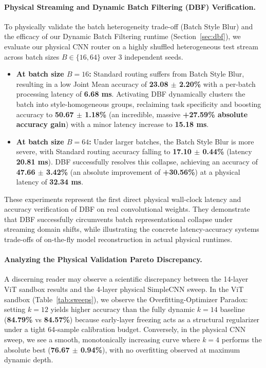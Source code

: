 \paragraph{Physical Streaming and Dynamic Batch Filtering (DBF) Verification.}
To physically validate the batch heterogeneity trade-off (Batch Style Blur) and the efficacy of our Dynamic Batch Filtering runtime (Section~\ref{sec:dbf}), we evaluate our physical CNN router on a highly shuffled heterogeneous test stream across batch sizes $B \in \{16, 64\}$ over 3 independent seeds. 
\begin{itemize}
    \item \textbf{At batch size $B=16$:} Standard routing suffers from Batch Style Blur, resulting in a low Joint Mean accuracy of \textbf{23.08 $\pm$ 2.20\%} with a per-batch processing latency of \textbf{6.68 ms}. Activating DBF dynamically clusters the batch into style-homogeneous groups, reclaiming task specificity and boosting accuracy to \textbf{50.67 $\pm$ 1.18\%} (an incredible, massive \textbf{+27.59\% absolute accuracy gain}) with a minor latency increase to \textbf{15.18 ms}.
    \item \textbf{At batch size $B=64$:} Under larger batches, the Batch Style Blur is more severe, with Standard routing accuracy falling to \textbf{17.10 $\pm$ 0.44\%} (latency \textbf{20.81 ms}). DBF successfully resolves this collapse, achieving an accuracy of \textbf{47.66 $\pm$ 3.42\%} (an absolute improvement of \textbf{+30.56\%}) at a physical latency of \textbf{32.34 ms}.
\end{itemize}
These experiments represent the first direct physical wall-clock latency and accuracy verification of DBF on real convolutional weights. They demonstrate that DBF successfully circumvents batch representational collapse under streaming domain shifts, while illustrating the concrete latency-accuracy systems trade-offs of on-the-fly model reconstruction in actual physical runtimes.

\paragraph{Analyzing the Physical Validation Pareto Discrepancy.}
A discerning reader may observe a scientific discrepancy between the 14-layer ViT sandbox results and the 4-layer physical SimpleCNN sweep. In the ViT sandbox (Table~\ref{tab:sweeps}), we observe the Overfitting-Optimizer Paradox: setting $k=12$ yields higher accuracy than the fully dynamic $k=14$ baseline (\textbf{84.79\%} vs \textbf{84.57\%}) because early-layer freezing acts as a structural regularizer under a tight 64-sample calibration budget. Conversely, in the physical CNN sweep, we see a smooth, monotonically increasing curve where $k=4$ performs the absolute best (\textbf{76.67 $\pm$ 0.94\%}), with no overfitting observed at maximum dynamic depth.

